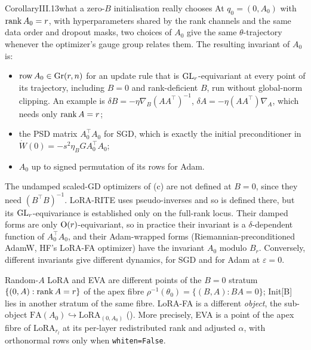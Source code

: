 \begin{restate}{Corollary}{III.13}{what a zero-$B$ initialisation really chooses}
At $q_0=(0,A_0)$ with $\operatorname{rank} A_0=r$, with hyperparameters shared by the rank channels and the same data order and dropout
masks, two choices of $A_0$ give the same $\theta$-trajectory whenever the optimizer's gauge group relates them. The
resulting invariant of $A_0$ is:
\begin{itemize}
\item $\operatorname{row}A_0\in\operatorname{Gr}(r,n)$ for an update rule that is $\mathrm{GL}_r$-equivariant at every point of its trajectory,
including $B=0$ and rank-deficient $B$, run without global-norm clipping. An example is
$\delta B=-\eta\nabla_B(AA^\top)^{-1}$, $\delta A=-\eta(AA^\top)\nabla_A$, which needs only $\operatorname{rank} A=r$;
\item the PSD matrix $A_0^\top A_0$ for SGD, which is exactly the initial preconditioner in
$\dot W(0)=-s^2\eta_BGA_0^\top A_0$;
\item $A_0$ up to signed permutation of its rows for Adam.
\end{itemize}
The undamped scaled-GD optimizers of (c) are not defined at $B=0$, since they need
$(B^\top B)^{-1}$. LoRA-RITE uses pseudo-inverses and so is defined there, but its $\mathrm{GL}_r$-equivariance is established only
on the full-rank locus. Their damped forms are only $\mathrm{O}(r)$-equivariant, so in practice their invariant is a
$\delta$-dependent function of $A_0^\top A_0$, and their Adam-wrapped forms (Riemannian-preconditioned AdamW, HF's LoRA-FA
optimizer) have the invariant $A_0$ modulo $B_r$. Conversely, different invariants give different dynamics, for SGD and
for Adam at $\varepsilon=0$.

Random-$A$ LoRA and EVA are different points of the $B=0$ stratum $\{(0,A):\operatorname{rank} A=r\}$ of the apex fibre
$\rho^{-1}(\theta_0)=\{(B,A):BA=0\}$; Init[B] lies in another stratum of the same fibre. LoRA-FA is a different
\emph{object}, the sub-object $\mathrm{FA}(A_0)\hookrightarrow\mathrm{LoRA}_{(0,A_0)}$ (). More
precisely, EVA is a point of the apex fibre of $\mathrm{LoRA}_{r_l}$ at its per-layer redistributed rank and adjusted
$\alpha$, with orthonormal rows only when \texttt{whiten=False}.
\end{restate}

